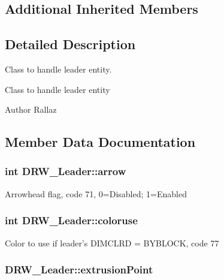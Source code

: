 \subsection*{Additional Inherited Members}


\subsection{Detailed Description}
Class to handle leader entity. 

Class to handle leader entity \begin{DoxyAuthor}{Author}
Rallaz 
\end{DoxyAuthor}


\subsection{Member Data Documentation}
\hypertarget{classDRW__Leader_a42f61a808411cf8465ec7f64c49cc4a6}{
\subsubsection[{arrow}]{\setlength{\rightskip}{0pt plus 5cm}int D\-R\-W\-\_\-\-Leader\-::arrow}}\label{classDRW__Leader_a42f61a808411cf8465ec7f64c49cc4a6}
Arrowhead flag, code 71, 0=Disabled; 1=Enabled \hypertarget{classDRW__Leader_afdff2ddfa67b8f2f46b367f52e06e027}{
\subsubsection[{coloruse}]{\setlength{\rightskip}{0pt plus 5cm}int D\-R\-W\-\_\-\-Leader\-::coloruse}}\label{classDRW__Leader_afdff2ddfa67b8f2f46b367f52e06e027}
Color to use if leader's D\-I\-M\-C\-L\-R\-D = B\-Y\-B\-L\-O\-C\-K, code 77 \hypertarget{classDRW__Leader_a9ef3ab714584747ac54612c47edd570a}{
\subsubsection[{extrusion\-Point}]{ D\-R\-W\-\_\-\-Leader\-::extrusion\-Point}}\label{classDRW__Leader_a9ef3ab714584747ac54612c47edd570a}
